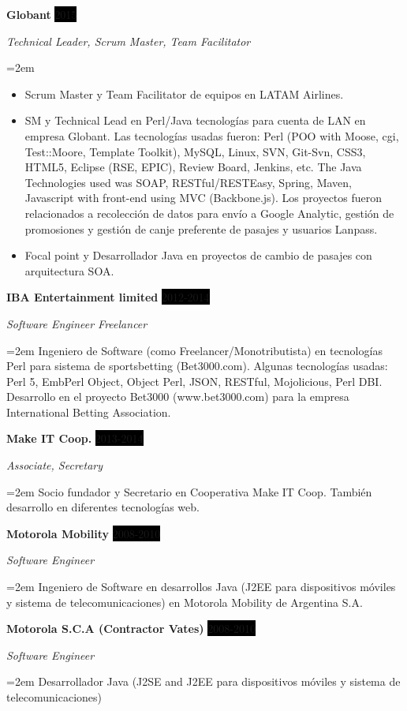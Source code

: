 \documentclass[paper=a4,fontsize=11pt]{scrartcl} %
\newcommand{\sepspace}{\vspace*{1em}}		%
\newcommand{\EducationEntry}[4]{
		\noindent \textbf{#1} \hfill      %
		\colorbox{Black}{%
			\parbox{6em}{%
			\hfill\color{White}#2}} \par  %
		\noindent \textit{#3} \par        %
		\noindent\hangindent=2em\hangafter=0 \small #4 %
		\normalsize \par}
\newcommand{\WorkEntry}[4]{				  %
		\noindent \textbf{#1} \hfill      %
		\colorbox{Black}{\color{White}#2} \par  %
		\noindent \textit{#3} \par              %
		\noindent\hangindent=2em\hangafter=0 \small #4 %
		\normalsize \par}
\begin{document}
\WorkEntry{Globant}{2015}{Technical Leader, Scrum Master, Team Facilitator}
{
\begin{itemize}
\item Scrum Master y Team Facilitator de equipos en LATAM Airlines.
\item SM y Technical Lead en Perl/Java tecnologías para cuenta de LAN en empresa Globant. Las tecnologías usadas fueron: Perl (POO with Moose, cgi, Test::Moore, Template Toolkit), MySQL, Linux, SVN, Git-Svn, CSS3, HTML5, Eclipse (RSE, EPIC), Review Board, Jenkins, etc. The Java Technologies used was SOAP, RESTful/RESTEasy, Spring, Maven, Javascript with front-end using MVC (Backbone.js). Los proyectos fueron  relacionados a recolección de datos para envío a Google Analytic, gestión de promosiones y gestión de canje preferente de pasajes y usuarios Lanpass.
\item Focal point y Desarrollador Java en proyectos de cambio de pasajes con arquitectura SOA.
\end{itemize}
}

\sepspace

\WorkEntry{IBA Entertainment limited}{2012-2014}{Software Engineer Freelancer}
{Ingeniero de Software (como Freelancer/Monotributista) en tecnologías Perl para sistema de sportsbetting (Bet3000.com). Algunas tecnologías usadas: Perl 5, EmbPerl Object, Object Perl, JSON, RESTful, Mojolicious, Perl DBI. Desarrollo en el proyecto Bet3000 (www.bet3000.com) para la empresa International Betting Association.}

\sepspace

\WorkEntry{Make IT Coop.}{2013-2014}{Associate, Secretary}{
Socio fundador y Secretario en Cooperativa Make IT Coop. También desarrollo en diferentes tecnologías web.}

\sepspace

\WorkEntry{Motorola Mobility}{2008-2010}{Software Engineer}
{Ingeniero de Software en desarrollos Java (J2EE para dispositivos móviles y sistema de telecomunicaciones) en Motorola Mobility de Argentina S.A.}

\sepspace

\WorkEntry{Motorola S.C.A (Contractor Vates)}{2008-2010}{Software Engineer}
{Desarrollador Java (J2SE and J2EE para dispositivos móviles y sistema de telecomunicaciones)}
\end{document}
